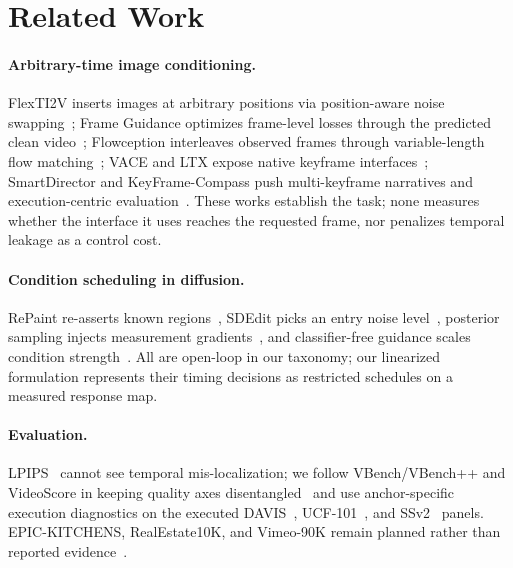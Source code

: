 \documentclass[letterpaper]{article}
\begin{document}
\section{Related Work}
\paragraph{Arbitrary-time image conditioning.}
FlexTI2V inserts images at arbitrary positions via position-aware noise
swapping~\citep{lai2025flexti2v}; Frame Guidance optimizes frame-level
losses through the predicted clean video~\citep{jang2025frameguidance};
Flowception interleaves observed frames through variable-length flow
matching~\citep{ifriqi2025flowception}; VACE and LTX expose native
keyframe interfaces~\citep{jiang2025vace,hacohen2025ltx}; SmartDirector
and KeyFrame-Compass push multi-keyframe narratives and execution-centric
evaluation~\citep{zhang2026smartdirector,tang2026keyframecompass}. These
works establish the task; none measures whether the interface it uses
reaches the requested frame, nor penalizes temporal leakage as a control cost.
\paragraph{Condition scheduling in diffusion.}
RePaint re-asserts known regions~\citep{lugmayr2022repaint}, SDEdit picks
an entry noise level~\citep{meng2022sdedit}, posterior sampling injects
measurement gradients~\citep{chung2023dps}, and classifier-free guidance
scales condition strength~\citep{ho2022cfg}. All are open-loop in our
taxonomy; our linearized formulation represents their timing decisions as
restricted schedules on a measured response map.
\paragraph{Evaluation.}
LPIPS~\citep{zhang2018lpips} cannot see temporal mis-localization; we
follow VBench/VBench++ and VideoScore in keeping quality axes
disentangled~\citep{huang2024vbench,huang2024vbenchpp,he2024videoscore}
and use anchor-specific execution diagnostics on the executed
DAVIS~\citep{perazzi2016davis}, UCF-101~\citep{soomro2012ucf101}, and
SSv2~\citep{goyal2017something} panels. EPIC-KITCHENS, RealEstate10K, and
Vimeo-90K remain planned rather than reported
evidence~\citep{damen2022epic,zhou2018realestate,xue2019vimeo}.
\end{document}
